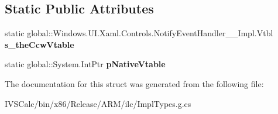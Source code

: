 \subsection*{Static Public Attributes}
\begin{DoxyCompactItemize}
\item 
\mbox{\label{struct_windows_1_1_u_i_1_1_xaml_1_1_controls_1_1_notify_event_handler_____impl_1_1_vtbl_a0e39927fcc04ec8bd8131bfaf13b6ae4}} 
static global\+::\+Windows.\+U\+I.\+Xaml.\+Controls.\+Notify\+Event\+Handler\+\_\+\+\_\+\+Impl.\+Vtbl {\bfseries s\+\_\+the\+Ccw\+Vtable}
\item 
\mbox{\label{struct_windows_1_1_u_i_1_1_xaml_1_1_controls_1_1_notify_event_handler_____impl_1_1_vtbl_aac436f94417423141c6bad611887cfc3}} 
static global\+::\+System.\+Int\+Ptr {\bfseries p\+Native\+Vtable}
\end{DoxyCompactItemize}


The documentation for this struct was generated from the following file\+:\begin{DoxyCompactItemize}
\item 
I\+V\+S\+Calc/bin/x86/\+Release/\+A\+R\+M/ilc/Impl\+Types.\+g.\+cs\end{DoxyCompactItemize}
